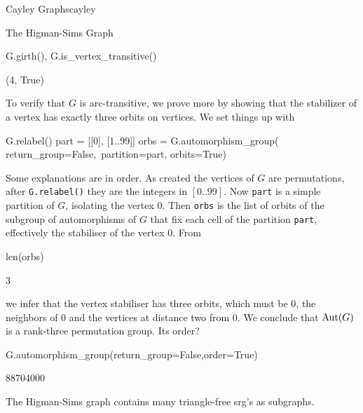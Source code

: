 \begin{chap}{Cayley Graphs}{cayley}
\begin{sect}{The Higman-Sims Graph}
\begin{sagecode}
\begin{sageinput}
G.girth(), G.is_vertex_transitive()
\end{sageinput}
\begin{sageoutput}
(4, True)
\end{sageoutput}
\end{sagecode}
%
\begin{para}
To verify that $G$ is arc-transitive, we prove more by showing
that the stabilizer of a vertex has exactly three orbits on vertices.
We set things up with
\end{para}
%
\begin{sagecode}
\begin{sageinput}
G.relabel()
part = [[0], [1..99]]
orbs = G.automorphism_group( return_group=False,\
    partition=part, orbits=True)
\end{sageinput}
\end{sagecode}
%
\begin{para}
Some explanations are in order. As created the vertices of $G$ are permutations,
after \verb|G.relabel()| they are the integers in $[0..99]$. Now
\verb|part| is a simple partition of $G$, isolating the vertex $0$.  Then 
\verb|orbs| is the list of orbits of the subgroup of automorphisms of $G$
that fix each cell of the partition \texttt{part}, effectively the 
stabiliser of the vertex $0$. From
\end{para}
%
\begin{sagecode}
\begin{sageinput}
len(orbs)
\end{sageinput}
\begin{sageoutput}
3
\end{sageoutput}
\end{sagecode}
%
\begin{para}
we infer that the vertex stabiliser has three orbits, which must be 0,
the neighbors of 0 and the vertices at distance two from 0. We conclude
that $\mathrm{Aut}(G)$ is a rank-three permutation group. Its order?
\end{para}
%
\begin{sagecode}
\begin{sageinput}
G.automorphism_group(return_group=False,order=True)
\end{sageinput}
\begin{sageoutput}
88704000
\end{sageoutput}
\end{sagecode}
%
\begin{para}
The Higman-Sims graph contains many triangle-free srg's as subgraphs.

\end{para}
\end{sect}
\end{chap}
